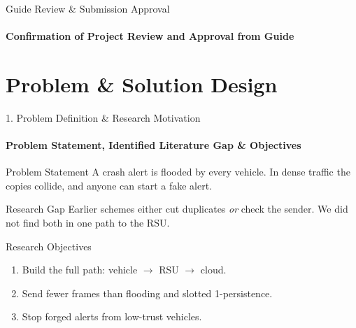 \documentclass[aspectratio=169, 11pt]{beamer}
\begin{document}
\begin{frame}{Guide Review \& Submission Approval}
    \framesubtitle{Confirmation of Project Review and Approval from Guide}
    \centering
\end{frame}

\section{Problem \& Solution Design}

\begin{frame}{1. Problem Definition \& Research Motivation}
    \framesubtitle{Problem Statement, Identified Literature Gap \& Objectives}
    \begin{block}{Problem Statement}
        A crash alert is flooded by every vehicle. In dense traffic the copies collide, and anyone can start a fake alert.
    \end{block}

    \begin{block}{Research Gap}
        Earlier schemes either cut duplicates \emph{or} check the sender. We did not find both in one path to the RSU.
    \end{block}

    \begin{block}{Research Objectives}
        \begin{enumerate}
            \item Build the full path: vehicle $\rightarrow$ RSU $\rightarrow$ cloud.
            \item Send fewer frames than flooding and slotted 1-persistence.
            \item Stop forged alerts from low-trust vehicles.
        \end{enumerate}
    \end{block}
\end{frame}
\end{document}
